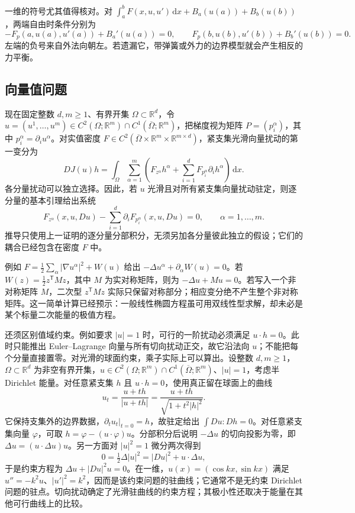 \ProseParagraphBreak

一维的符号尤其值得核对。对 \(\int_a^bF(x,u,u')\,\mathrm dx+B_a(u(a))+B_b(u(b))\)，两端自由时条件分别为
\[-F_p(a,u(a),u'(a))+B_a'(u(a))=0,\qquad F_p(b,u(b),u'(b))+B_b'(u(b))=0.\]
左端的负号来自外法向朝左。若遗漏它，带弹簧或外力的边界模型就会产生相反的力平衡。

\subsection{向量值问题}
\label{b2:subsec:140204}

现在固定整数 \(d,m\geq1\)、有界开集 \(\Omega\subset\mathbb R^d\)，令 \(u=(u^1,\ldots,u^m)\in C^2(\Omega;\mathbb R^m)\cap C^1(\overline\Omega;\mathbb R^m)\)，把梯度视为矩阵 \(P=(p_i^\alpha)\)，其中 \(p_i^\alpha=\partial_i u^\alpha\)。对实值密度 \(F\in C^2(\overline\Omega\times\mathbb R^m\times\mathbb R^{m\times d})\)，紧支集光滑向量扰动的第一变分为
\[
 DJ(u)h=\int_\Omega\sum_{\alpha=1}^m
 \left(F_{z^\alpha}h^\alpha+\sum_{i=1}^dF_{p_i^\alpha}\partial_i h^\alpha\right)\,\mathrm dx.
\]
各分量扰动可以独立选择。因此，若 \(u\) 光滑且对所有紧支集向量扰动驻定，则逐分量的基本引理给出系统
\[
 F_{z^\alpha}(x,u,Du)-\sum_{i=1}^d\partial_iF_{p_i^\alpha}(x,u,Du)=0,
 \qquad \alpha=1,\ldots,m.
\]
推导只使用上一证明的逐分量分部积分，无须另加各分量彼此独立的假设；它们的耦合已经包含在密度 \(F\) 中。

\ProseParagraphBreak

例如 \(F=\tfrac12\sum_\alpha|\nabla u^\alpha|^2+W(u)\) 给出 \(-\Delta u^\alpha+\partial_\alpha W(u)=0\)。若 \(W(z)=\tfrac12z^{\mathsf T}Mz\)，其中 \(M\) 为实对称矩阵，则为 \(-\Delta u+Mu=0\)。若写入一个非对称矩阵 \(M\)，二次型 \(z^{\mathsf T}Mz\) 实际只保留对称部分；相应变分绝不产生整个非对称矩阵。这一简单计算已经预示：一般线性椭圆方程虽可用双线性型求解，却未必是某个标量二次能量的极值方程。

\ProseParagraphBreak

还须区别值域约束。例如要求 \(|u|=1\) 时，可行的一阶扰动必须满足 \(u\cdot h=0\)。此时只能推出 Euler--Lagrange 向量与所有切向扰动正交，故它沿法向 \(u\)；不能把每个分量直接置零。对光滑的球面约束，乘子实际上可以算出。设整数 \(d,m\geq1\)，\(\Omega\subset\mathbb R^d\) 为非空有界开集，\(u\in C^2(\Omega;\mathbb R^m)\cap C^1(\overline\Omega;\mathbb R^m)\)、\(|u|=1\)，考虑半 Dirichlet 能量。对任意紧支集 \(h\) 且 \(u\cdot h=0\)，使用真正留在球面上的曲线
\[u_t=\frac{u+th}{|u+th|}=\frac{u+th}{\sqrt{1+t^2|h|^2}}.\]
它保持支集外的边界数据，\(\partial_tu_t|_{t=0}=h\)，故驻定给出 \(\int Du:Dh=0\)。对任意紧支集向量 \(\varphi\)，可取 \(h=\varphi-(u\cdot\varphi)u\)。分部积分后说明 \(-\Delta u\) 的切向投影为零，即 \(\Delta u=(u\cdot\Delta u)u\)。另一方面对 \(|u|^2=1\) 微分两次得到
\[0=\tfrac12\Delta|u|^2=|Du|^2+u\cdot\Delta u,\]
于是约束方程为 \(\Delta u+|Du|^2u=0\)。在一维，\(u(x)=(\cos kx,\sin kx)\) 满足 \(u''=-k^2u\)、\(|u'|^2=k^2\)，因而是该约束问题的驻曲线；它通常不是无约束 Dirichlet 问题的驻点。切向扰动确定了光滑驻曲线的约束方程；其极小性还取决于能量在其他可行曲线上的比较。

